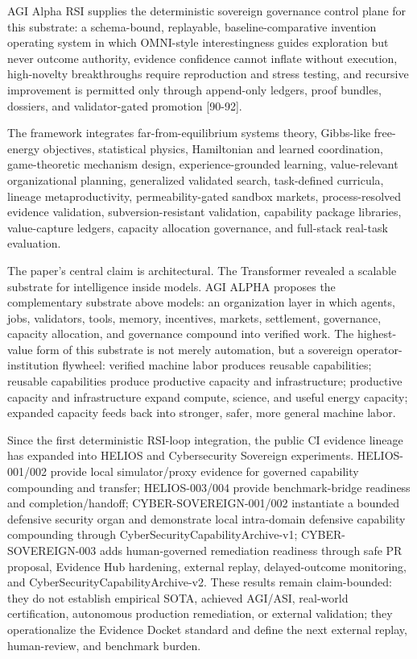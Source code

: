 AGI Alpha RSI supplies the deterministic sovereign governance control
plane for this substrate: a schema-bound, replayable,
baseline-comparative invention operating system in which OMNI-style
interestingness guides exploration but never outcome authority, evidence
confidence cannot inflate without execution, high-novelty breakthroughs
require reproduction and stress testing, and recursive improvement is
permitted only through append-only ledgers, proof bundles, dossiers, and
validator-gated promotion {[}90-92{]}.

The framework integrates far-from-equilibrium systems theory, Gibbs-like
free-energy objectives, statistical physics, Hamiltonian and learned
coordination, game-theoretic mechanism design, experience-grounded
learning, value-relevant organizational planning, generalized validated
search, task-defined curricula, lineage metaproductivity,
permeability-gated sandbox markets, process-resolved evidence
validation, subversion-resistant validation, capability package
libraries, value-capture ledgers, capacity allocation governance, and
full-stack real-task evaluation.

The paper's central claim is architectural. The Transformer revealed a
scalable substrate for intelligence inside models. AGI ALPHA proposes
the complementary substrate above models: an organization layer in which
agents, jobs, validators, tools, memory, incentives, markets,
settlement, governance, capacity allocation, and governance compound
into verified work. The highest-value form of this substrate is not
merely automation, but a sovereign operator-institution flywheel:
verified machine labor produces reusable capabilities; reusable
capabilities produce productive capacity and infrastructure; productive
capacity and infrastructure expand compute, science, and useful energy
capacity; expanded capacity feeds back into stronger, safer, more
general machine labor.

Since the first deterministic RSI-loop integration, the public CI
evidence lineage has expanded into HELIOS and Cybersecurity Sovereign
experiments. HELIOS-001/002 provide local simulator/proxy evidence for
governed capability compounding and transfer; HELIOS-003/004 provide
benchmark-bridge readiness and completion/handoff;
CYBER-SOVEREIGN-001/002 instantiate a bounded defensive security organ
and demonstrate local intra-domain defensive capability compounding
through CyberSecurityCapabilityArchive-v1; CYBER-SOVEREIGN-003 adds
human-governed remediation readiness through safe PR proposal, Evidence
Hub hardening, external replay, delayed-outcome monitoring, and
CyberSecurityCapabilityArchive-v2. These results remain claim-bounded:
they do not establish empirical SOTA, achieved AGI/ASI, real-world
certification, autonomous production remediation, or external
validation; they operationalize the Evidence Docket standard and define
the next external replay, human-review, and benchmark burden.


